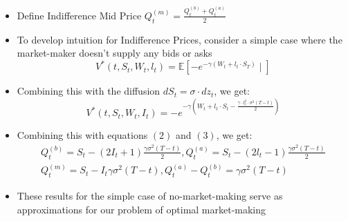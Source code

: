 \documentclass[10pt]{article}
\begin{document}
\begin{itemize} 
    \item Define Indifference Mid Price $Q_{t}^{(m)}=\frac{Q_{t}^{(b)}+Q_{t}^{(a)}}{2}$
    \item To develop intuition for Indifference Prices, consider a simple case where the market-maker doesn't supply any bids or asks
    $$
    V^{*}\left(t, S_{t}, W_{t}, l_{t}\right)=\mathbb{E}\left[-e^{-\gamma\left(W_{t}+l_{t} \cdot S_{T}\right)} \mid\right]
    $$
    \item Combining this with the diffusion $d S_{t}=\sigma \cdot d z_{t}$, we get:
    $$
    V^{*}\left(t, S_{t}, W_{t}, I_{t}\right)=-e^{-\gamma\left(W_{t}+l_{t} \cdot S_{t}-\frac{\gamma \cdot l_{t}^{2} \cdot \sigma^{2}(T-t)}{2}\right)}
    $$
    \item Combining this with equations $(2)$ and $(3)$, we get:
    $$
    \begin{array}{c}
    Q_{t}^{(b)}=S_{t}-\left(2 I_{t}+1\right) \frac{\gamma \sigma^{2}(T-t)}{2}, Q_{t}^{(a)}=S_{t}-\left(2 l_{t}-1\right) \frac{\gamma \sigma^{2}(T-t)}{2} \\
    Q_{t}^{(m)}=S_{t}-I_{t} \gamma \sigma^{2}(T-t), Q_{t}^{(a)}-Q_{t}^{(b)}=\gamma \sigma^{2}(T-t)
    \end{array}
    $$
    \item These results for the simple case of no-market-making serve as approximations for our problem of optimal market-making
\end{itemize}
\end{document}

